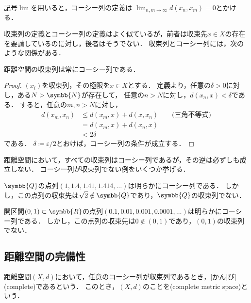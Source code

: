 \documentclass{sotsu}
\begin{document}
記号$\lim$を用いると，コーシー列の定義は
$\lim_{n, m \to \infty} d(x_n, x_m) = 0$とかける．

収束列の定義とコーシー列の定義はよく似ているが，前者は収束先$x \in X$の存在を要請しているのに対し，後者はそうでない．
収束列とコーシー列には，次のような関係がある．
\begin{theorem}
    \label{thm:convergent-is-Cauchy}
    距離空間の収束列は常にコーシー列である．
\end{theorem}

\begin{proof}
    $(x_i)$を収束列，その極限を$x \in X$とする．
    定義より，任意の$\delta > 0$に対し，ある$N > \symbb{N}$が存在して，
    任意の$n > N$に対し，$d(x_n, x) < \delta$である．
    すると，任意の$m, n > N$に対し，
    \begin{equation*}
        \begin{split}
            d(x_m, x_n) &\leq d(x_m, x) + d(x, x_n)  \qquad \text{(三角不等式)}  \\
                &= d(x_m, x) + d(x_n, x)  \\
                &< 2\delta
        \end{split}
    \end{equation*}
    である．
    $\delta \coloneq \varepsilon/2$とおけば，コーシー列の条件が成立する．
\end{proof}

距離空間において，すべての収束列はコーシー列であるが，その逆は必ずしも成立しない．
コーシー列が収束列でない例をいくつか挙げる．

\begin{example}
    $\symbb{Q}$の点列$(1, 1.4, 1.41, 1.414, \dotsc)$は明らかにコーシー列である．
    しかし，この点列の収束先は$\sqrt{2} \notin \symbb{Q}$であり，$\symbb{Q}$の収束列でない．
\end{example}

\begin{example}
    開区間$(0, 1) \subset \symbb{R}$の点列$(0.1, 0.01, 0.001, 0.0001, \dotsc)$は明らかにコーシー列である．
    しかし，この点列の収束先は$0 \notin (0, 1)$であり，$(0, 1)$の収束列でない．
\end{example}


\subsection{距離空間の完備性}

\begin{definition}
    距離空間$(X, d)$において，任意のコーシー列が収束列であるとき，[かん|び](complete)であるという．
    このとき，$(X, d)$のことを(complete metric space)という．
\end{definition}
\end{document}

